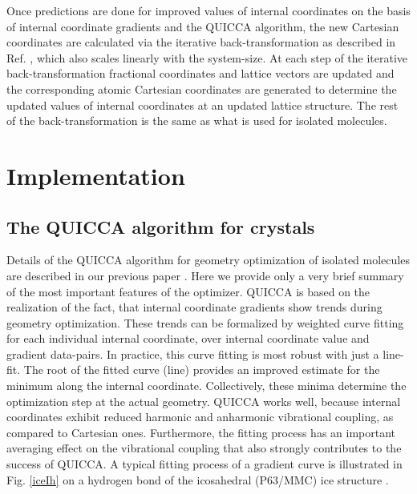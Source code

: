 \documentclass[prl,aps,preprint,superbib,12pt]{revtex4}
\begin{document}
Once predictions are done for improved values of internal coordinates
on the basis of internal coordinate gradients and the QUICCA 
\cite{KNemeth04} algorithm, the new Cartesian coordinates 
are calculated via the iterative back-transformation
as described in Ref. , which also scales 
linearly with the system-size. At each step of the iterative 
back-transformation fractional coordinates and lattice vectors
are updated and the corresponding atomic Cartesian coordinates are
generated to determine the updated values of internal coordinates
at an updated lattice structure. The rest of the back-transformation
is the same as what is used for isolated molecules.

\section{Implementation}

\subsection{The QUICCA algorithm for crystals} \label{QUICCAreview}
Details of the QUICCA algorithm for geometry optimization 
of isolated molecules are 
described in our previous paper \cite{KNemeth04}. Here we provide 
only a very brief summary of the most important features of the 
optimizer.
QUICCA is based on the realization of the fact, that internal coordinate
gradients show trends during geometry optimization.
These trends can be formalized by weighted curve fitting for each 
individual internal coordinate, over internal coordinate value and 
gradient data-pairs.
In practice, this curve fitting is most robust with just a line-fit. 
The root of the
fitted curve (line) provides an improved estimate for the minimum
along the internal coordinate. Collectively, these minima determine
the optimization step at the actual geometry.
QUICCA works well, because internal coordinates exhibit  
reduced harmonic and anharmonic vibrational coupling, as
compared to Cartesian ones. Furthermore, the fitting process
has an important averaging effect on the vibrational coupling
that also strongly contributes to the success of QUICCA.
A typical fitting process of a gradient curve is illustrated in 
Fig. \ref{iceIh} on a hydrogen bond of the icosahedral (P63/MMC)
ice structure \cite{AGoto90}.
\end{document}
